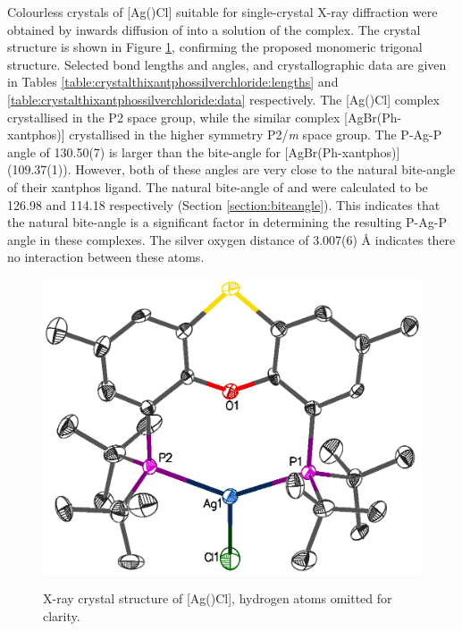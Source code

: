 Colourless crystals of [Ag(\tButhixantphos)Cl] suitable for single-crystal X-ray diffraction were obtained by inwards diffusion of  into a  solution of the complex.  The crystal structure is shown in Figure \ref{Crystalthixantphossilverchloride}, confirming the proposed monomeric trigonal structure.  Selected bond lengths and angles, and crystallographic data are given in Tables \ref{table:crystalthixantphossilverchloride:lengths} and \ref{table:crystalthixantphossilverchloride:data} respectively.  The [Ag(\tButhixantphos)Cl] complex crystallised in the P2 space group, while the similar complex [AgBr(Ph-xantphos)] crystallised in the higher symmetry P2/\emph{m} space group.\cite{Kaltzoglou2007}  The P-Ag-P angle of 130.50(7)\degrees{} is larger than the bite-angle for [AgBr(Ph-xantphos)] (109.37(1)\degrees{}).  However, both of these angles are very close to the natural bite-angle of their xantphos ligand.  The natural bite-angle of \tButhixantphos{} and \Phxantphos{} were calculated to be 126.98\degrees{} and 114.18\degrees{} respectively (Section \ref{section:biteangle}).  This indicates that the natural bite-angle is a significant factor in determining the resulting P-Ag-P angle in these complexes.  The silver oxygen distance of 3.007(6) \si{\angstrom} indicates there no interaction between these atoms.


\begin{figure}[htbp]
\begin{center}
\vspace{0.5cm}
\includegraphics[scale=0.8]{../Figures/Crystalthixantphossilverchloride.eps}
\caption[X-ray crystal structure of [Ag(\tButhixantphos)Cl{]}]{X-ray crystal structure of [Ag(\tButhixantphos)Cl], hydrogen atoms omitted for clarity.}
\vspace{0.2cm}
\label{Crystalthixantphossilverchloride}
\vspace{0.2cm}
\end{center}
\end{figure}
\vspace{0.2cm}




